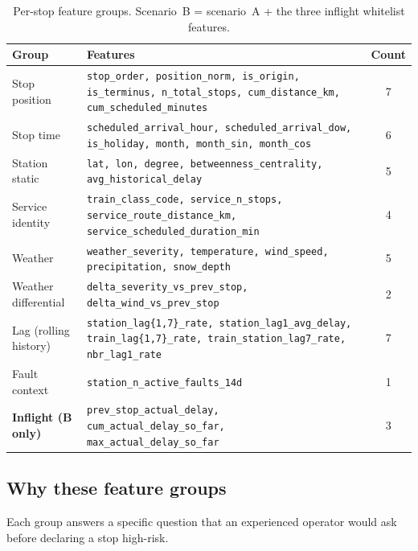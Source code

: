 \begin{table}[H]
    \centering
    \caption{Per-stop feature groups. Scenario~B = scenario~A + the three inflight whitelist features.}
    \label{tab:feature-groups}
    \footnotesize
    \setlength{\tabcolsep}{6pt}
    \begin{tabularx}{\textwidth}{l X S[table-format=2.0]}
        \toprule
        Group & Features & {Count} \\
        \midrule
        Stop position        & \texttt{stop\_order, position\_norm, is\_origin, is\_terminus, n\_total\_stops, cum\_distance\_km, cum\_scheduled\_minutes} & 7 \\
        Stop time            & \texttt{scheduled\_arrival\_hour, scheduled\_arrival\_dow, is\_holiday, month, month\_sin, month\_cos} & 6 \\
        Station static       & \texttt{lat, lon, degree, betweenness\_centrality, avg\_historical\_delay} & 5 \\
        Service identity     & \texttt{train\_class\_code, service\_n\_stops, service\_route\_distance\_km, service\_scheduled\_duration\_min} & 4 \\
        Weather              & \texttt{weather\_severity, temperature, wind\_speed, precipitation, snow\_depth} & 5 \\
        Weather differential & \texttt{delta\_severity\_vs\_prev\_stop, delta\_wind\_vs\_prev\_stop} & 2 \\
        Lag (rolling history)& \texttt{station\_lag\{1,7\}\_rate, station\_lag1\_avg\_delay, train\_lag\{1,7\}\_rate, train\_station\_lag7\_rate, nbr\_lag1\_rate} & 7 \\
        Fault context        & \texttt{station\_n\_active\_faults\_14d} & 1 \\
        \midrule
        \textbf{Inflight (B only)} & \texttt{prev\_stop\_actual\_delay, cum\_actual\_delay\_so\_far, max\_actual\_delay\_so\_far} & 3 \\
        \bottomrule
    \end{tabularx}
\end{table}

\subsection{Why these feature groups}
\label{sec:feature-rationale}

Each group answers a specific question that an experienced operator would ask before declaring a stop high-risk.

